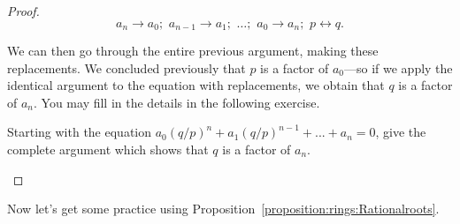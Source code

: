 \begin{proof}{}
$$ a_n  \rightarrow a_0;\,\, a_{n-1} \rightarrow a_1;\,\, \ldots;\,\, a_0 \rightarrow a_n; \,\,
p  \leftrightarrow q.$$

We can then go through the entire previous argument, making these replacements.   We concluded previously that $p$ is a factor of $a_0$---so if we apply the identical argument to the equation with replacements, we obtain that $q$ is a factor of $a_n$. You may fill in the details in the following exercise.

\begin{exercise}{}
Starting with the equation $a_{0}\left(q/p\right)^n+a_{1}\left(q/p\right)^{n-1}+...+a_{n}=0$, give the complete argument which shows that 
$q$ is a factor of $a_n$.
\end{exercise}

\end{proof}{}


Now let's get some practice using Proposition~\ref{proposition:rings:Rationalroots}.

